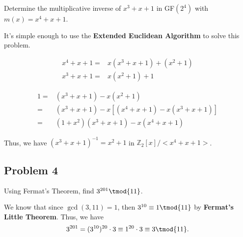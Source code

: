 \documentclass[../hw_sols.tex]{subfiles}
\begin{document}
Determine the multiplicative inverse of $x^3 + x + 1$ in GF$(2^4)$ with 
$m(x) = x^4 + x + 1$.

\begin{solution}

It's simple enough to use the \textbf{Extended Euclidean Algorithm} to solve 
this problem.

\begin{minipage}{0.45\linewidth}
	\begin{align*}
		x^4 + x + 1 =& x(x^3 + x + 1) + (x^2 + 1) \\
		x^3 + x + 1 =& x(x^2+ 1) + 1
	\end{align*}
\end{minipage}
\quad
\begin{minipage}{0.45\linewidth}
	\begin{align*}
		1 =& (x^3 + x + 1) - x(x^2 + 1) \\
		=& (x^3 + x + 1) - x[(x^4 + x+ 1) - x(x^3 + x + 1)] \\
		=& (1 + x^2)(x^3 + x + 1) - x(x^4 + x + 1)
	\end{align*}
\end{minipage}

\noindent Thus, we have $(x^3+x+1)^{-1} = x^2 + 1$ in 
$\mathbb{Z}_2[x]/<x^4+x+1>$.

\end{solution}


\newpage



\subsection*{Problem 4}

Using Fermat's Theorem, find $3^{201} \tmod{11}$.

\begin{solution}
We know that since $\gcd(3,11) = 1$, then $3^{10} \equiv 1 \tmod{11}$ by 
\textbf{Fermat's Little Theorem}. Thus, we have 
	$$3^{201} = (3^{10})^{20} \cdot 3 
	\equiv 1^{20} \cdot 3 \equiv 3 \tmod{11}.$$
\end{solution}


\newpage


\end{document}
